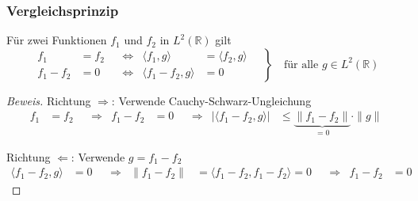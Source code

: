 %
%
%

%
%
\begin{frame}
\frametitle{Vergleichsprinzip}

\begin{vergleich}
Für zwei Funktionen $f_1$ und $f_2$ in $L^2(\mathbb R)$ gilt
\[
\left.
\begin{aligned}
f_1&=f_2
&&\Leftrightarrow&
\langle f_1,g\rangle &= \langle f_2,g\rangle
\\
f_1-f_2&=0
&&\Leftrightarrow&
\langle f_1-f_2,g\rangle &= 0
\end{aligned}
\quad\right\}
\quad
\text{für alle $g\in L^2(\mathbb R)$}
\]
\end{vergleich}
\vspace*{-10pt}

\begin{proof}[Beweis]
Richtung $\boxed{\Rightarrow}$\;: Verwende Cauchy-Schwarz-Ungleichung
\begin{align*}
f_1&=f_2
&&\Rightarrow&
f_1-f_2&=0
&&\Rightarrow&
|\langle f_1-f_2,g\rangle|
&\le
\underbrace{\|f_1-f_2\|}_{\displaystyle=0}\cdot \|g\|
\end{align*}
\vspace{-20pt}

Richtung $\boxed{\Leftarrow}$\;: Verwende $g=f_1-f_2$
\begin{align*}
\langle f_1-f_2,g\rangle&=0
&&\Rightarrow&
\|f_1-f_2\|
&=
\langle f_1-f_2,f_1-f_2\rangle
=
0
&&\Rightarrow&
f_1-f_2&=0
\end{align*}
\end{proof}

\end{frame}

